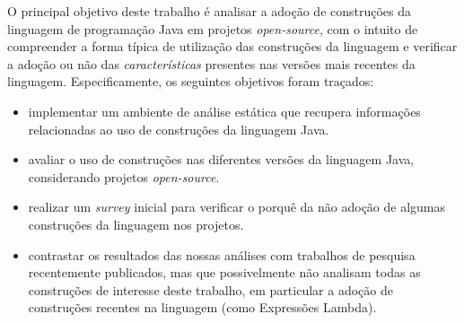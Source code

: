 	O principal objetivo deste trabalho é analisar a adoção de construções da linguagem de programação 
	Java em projetos \textit{open-source}, com o intuito de compreender a forma típica de utilização das construções 
	da linguagem e verificar a adoção ou não das \textit{caracter\'{i}sticas} presentes nas vers\~{o}es 
        mais recentes da linguagem. Especificamente, 
	os seguintes objetivos foram traçados:
	
	\begin{itemize}
	  \item implementar um ambiente de análise estática que recupera informações relacionadas ao uso 
	    de construções da linguagem Java. 
	  
	  \item avaliar o uso de construções nas diferentes versões da linguagem Java, considerando 
	  projetos \textit{open-source}. 
	  
	  \item realizar um \textit{survey} inicial para verificar o porqu\^{e} da não adoção de algumas construções 
	  da linguagem nos projetos. 
	  
	  \item contrastar os resultados das nossas análises com trabalhos de pesquisa recentemente publicados, 
	  mas que possivelmente não analisam todas as construções de interesse deste trabalho, em particular 
	  a adoção de construções recentes na linguagem (como Expressões Lambda). 
	\end{itemize}
	
%	

